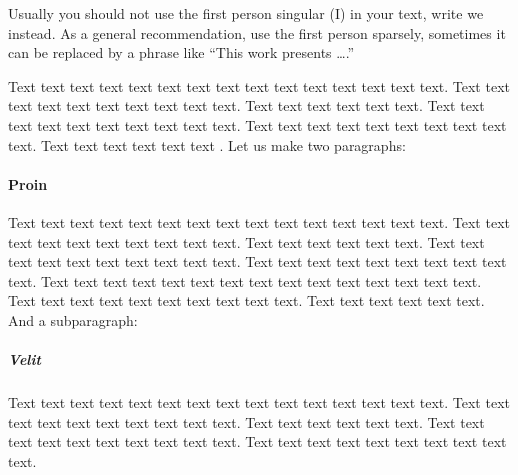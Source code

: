 Usually you should not use the first person singular (I) in your text, write we instead. As a general recommendation, use the first person sparsely, sometimes it can be replaced by a phrase like ``This work presents \ldots.''

Text text text text text text text text text text text text text text text. Text text text text text text text text text text. Text text text text text text. Text text text text text text text text text text. Text text text text text text text text text text. Text text text text text text \citep{Haufler2006}. Let us make two paragraphs:

\paragraph{Proin} Text text text text text text text text text text text text text text text. Text text text text text text text text text text. Text text text text text text. Text text text text text text text text text text. Text text text text text text text text text text.
Text text text text text text text text text text text text text text text. Text text text text text text text text text text. Text text text text text text. And a subparagraph:
\subparagraph{Velit} Text text text text text text text text text text text text text text text. Text text text text text text text text text text. Text text text text text text. Text text text text text text text text text text. Text text text text text text text text text text.

